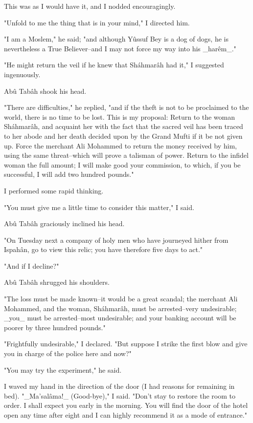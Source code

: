 This was as I would have it, and I nodded encouragingly.

"Unfold to me the thing that is in your mind," I directed him.

"I am a Moslem," he said; "and although Yûssuf Bey is a dog of dogs,
he is nevertheless a True Believer--and I may not force my way into
his _harêm_."

"He might return the veil if he knew that Sháhmarâh had it,"
I suggested ingenuously.

Abû Tabâh shook his head.

"There are difficulties," he replied, "and if the theft is not to
be proclaimed to the world, there is no time to be lost. This is my
proposal: Return to the woman Sháhmarâh, and acquaint her with the
fact that the sacred veil has been traced to her abode and her death
decided upon by the Grand Mufti if it be not given up. Force the
merchant Ali Mohammed to return the money received by him, using the
same threat--which will prove a talisman of power. Return to the
infidel woman the full amount; I will make good your commission,
to which, if you be successful, I will add two hundred pounds."

I performed some rapid thinking.

"You must give me a little time to consider this matter," I said.

Abû Tabâh graciously inclined his head.

"On Tuesday next a company of holy men who have journeyed hither from
Ispahân, go to view this relic; you have therefore five days to act."

"And if I decline?"

Abû Tabâh shrugged his shoulders.

"The loss must be made known--it would be a great scandal; the
merchant Ali Mohammed, and the woman, Sháhmarâh, must be
arrested--very undesirable; _you_ must be arrested--most undesirable;
and your banking account will be poorer by three hundred pounds."

"Frightfully undesirable," I declared. "But suppose I strike the first
blow and give you in charge of the police here and now?"

"You may try the experiment," he said.

I waved my hand in the direction of the door (I had reasons for
remaining in bed). "_Ma'salâma!_ (Good-bye)," I said. "Don't stay to
restore the room to order. I shall expect you early in the morning.
You will find the door of the hotel open any time after eight and I
can highly recommend it as a mode of entrance."

